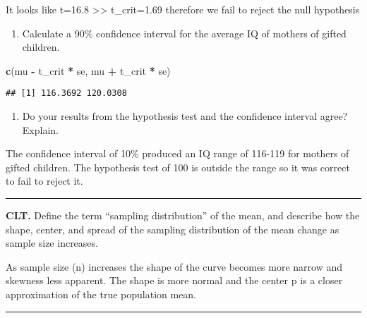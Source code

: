\documentclass[
]{article}
\newenvironment{Shaded}{\begin{snugshade}}{\end{snugshade}}
\newcommand{\KeywordTok}[1]{\textcolor[rgb]{0.13,0.29,0.53}{\textbf{#1}}}
\newcommand{\NormalTok}[1]{#1}
\newcommand{\OperatorTok}[1]{\textcolor[rgb]{0.81,0.36,0.00}{\textbf{#1}}}
\newcommand{\StringTok}[1]{\textcolor[rgb]{0.31,0.60,0.02}{#1}}
\providecommand{\tightlist}{%
  \setlength{\itemsep}{0pt}\setlength{\parskip}{0pt}}
\begin{document}
It looks like t=16.8 \textgreater\textgreater{} t\_crit=1.69 therefore
we fail to reject the null hypothesis

\begin{enumerate}
\def\labelenumi{(\alph{enumi})}
\setcounter{enumi}{1}
\tightlist
\item
  Calculate a 90\% confidence interval for the average IQ of mothers of
  gifted children.
\end{enumerate}

\begin{Shaded}
\begin{Highlighting}[]
\KeywordTok{c}\NormalTok{(mu }\OperatorTok{-}\StringTok{ }\NormalTok{t_crit }\OperatorTok{*}\StringTok{ }\NormalTok{se, mu }\OperatorTok{+}\StringTok{ }\NormalTok{t_crit }\OperatorTok{*}\StringTok{ }\NormalTok{se)}
\end{Highlighting}
\end{Shaded}

\begin{verbatim}
## [1] 116.3692 120.0308
\end{verbatim}

\begin{enumerate}
\def\labelenumi{(\alph{enumi})}
\setcounter{enumi}{2}
\tightlist
\item
  Do your results from the hypothesis test and the confidence interval
  agree? Explain.
\end{enumerate}

The confidence interval of 10\% produced an IQ range of 116-119 for
mothers of gifted children. The hypothesis test of 100 is outside the
range so it was correct to fail to reject it.

\begin{center}\rule{0.5\linewidth}{0.5pt}\end{center}

\clearpage

\textbf{CLT.} Define the term ``sampling distribution'' of the mean, and
describe how the shape, center, and spread of the sampling distribution
of the mean change as sample size increases.

As sample size (n) increases the shape of the curve becomes more narrow
and skewness less apparent. The shape is more normal and the center p is
a closer approximation of the true population mean.

\begin{center}\rule{0.5\linewidth}{0.5pt}\end{center}
\end{document}
